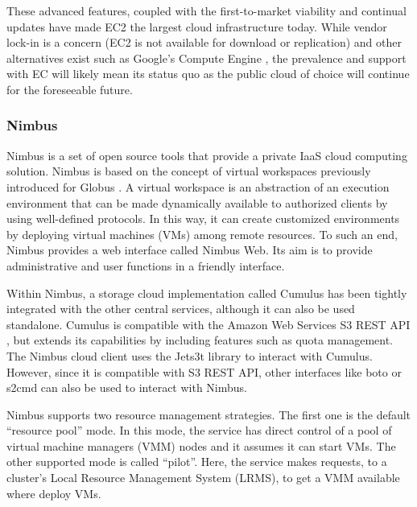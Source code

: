 These advanced features, coupled with the first-to-market viability and continual updates have made EC2 the largest cloud infrastructure today. While vendor lock-in is a concern (EC2 is not available for download or replication) and other alternatives exist such as Google's Compute Engine \cite{krishnan2015google}, the prevalence and support with EC will likely mean its status quo as the public cloud of choice will continue for the foreseeable future.  

\subsubsection{Nimbus}

Nimbus \cite{www/nimbus,virtualwork} is a set of open source tools that provide a private IaaS cloud computing solution. Nimbus is based on the concept of virtual workspaces previously introduced for Globus \cite{virtualwork}. A virtual workspace is an abstraction of an execution environment that can be made dynamically available to authorized clients by using well-defined protocols.  In this way, it can create customized environments by deploying virtual machines (VMs) among remote resources. To such an end, Nimbus provides a web interface called Nimbus Web. Its aim is to provide administrative and user functions in a friendly interface. 

Within Nimbus, a storage cloud implementation called Cumulus \cite{www/nimbus} has been tightly integrated with the other central services, although it can also be used standalone. Cumulus is compatible with the Amazon Web Services S3 REST API \cite{www/amazons3rest}, but extends its capabilities by including features such as quota management. The Nimbus cloud client uses the Jets3t library \cite{www/jets3t} to interact with Cumulus. However, since it is compatible with S3 REST API, other interfaces like boto \cite{www/boto} or s2cmd \cite{www/s3tools} can also be used to interact with Nimbus.

Nimbus supports two resource management strategies. The first one is the default ``resource pool'' mode. In this mode, the service has direct control of a pool of virtual machine managers (VMM) nodes and it assumes it can start VMs. The other supported mode is called ``pilot''. Here, the service makes requests, to a cluster's Local Resource Management System (LRMS), to get a VMM available where deploy VMs.

